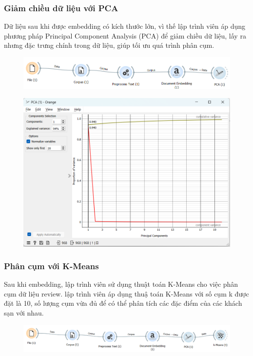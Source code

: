 \subsubsection{Giảm chiều dữ liệu với PCA}
Dữ liệu sau khi được embedding có kích thước lớn, vì thế lập trình viên áp dụng phương pháp Principal Component Analysis (PCA) để giảm chiều dữ liệu, lấy ra nhưng đặc trưng chính trong dữ liệu, giúp tối ưu quá trình phân cụm.

\begin{figure}[H]
    \centering
    \includegraphics[width=0.6\linewidth]{Figures/10.9.png}
\end{figure}

\begin{figure}[H]
    \centering
    \includegraphics[width=0.9\linewidth]{Figures/10.10.png}
    \caption{}
\end{figure}

\subsubsection{Phân cụm với K-Means}
Sau khi embedding, lập trình viên sử dụng thuật toán K-Means cho việc phân cụm dữ liệu review. lập trình viên áp dụng thuậ toán K-Means với số cụm k được đặt là 10, số lượng cụm vừa đủ để có thể phân tích các đặc điểm của các khách sạn với nhau.

\begin{figure}[H]
    \centering
    \includegraphics[width=0.5\linewidth]{Figures/10.11.png}
\end{figure}

